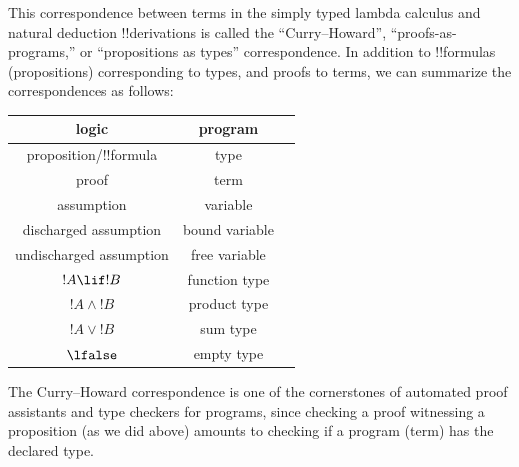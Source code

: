 \documentclass[../../../include/open-logic-section]{subfiles}
\begin{document}
This correspondence between terms in the simply typed lambda calculus
and natural deduction !!{derivation}s is called the ``Curry--Howard'',
``proofs-as-programs,'' or ``propositions as types'' correspondence.
In addition to !!{formula}s (propositions) corresponding to types, and
proofs to terms, we can summarize the correspondences as follows:
\begin{center}
  \begin{tabular}{c c c}
    logic & program \\
    \hline
    proposition/!!{formula} & type \\
    proof & term \\
    assumption & variable \\
    discharged assumption & bound variable \\
    undischarged assumption & free variable \\
    $!A \lif !B$ & function type \\
    $!A \land !B$ & product type \\
    $!A \lor !B$ & sum type \\
    $\lfalse$ & empty type \\
    \hline
  \end{tabular}
\end{center}

The Curry--Howard correspondence is one of the cornerstones of
automated proof assistants and type checkers for programs, since
checking a proof witnessing a proposition (as we did above) amounts to
checking if a program (term) has the declared type.
\end{document}
